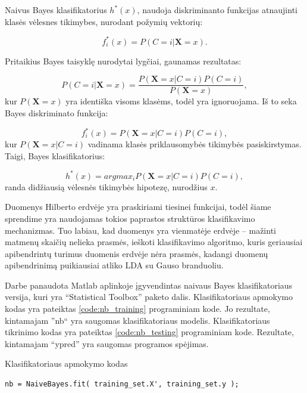 \documentclass[]{vgtuef}
\begin{document}
Naivus Bayes klasifikatorius $h^*(x)$, naudoja diskriminanto funkcijas atnaujinti klasės vėlesnes tikimybes, nurodant požymių vektorių:

\begin{equation}
	f^*_i(x) = P(C=i|\mathbf{X}=x).
\end{equation}

Pritaikius Bayes taisyklę nurodytai lygčiai, gaunamas rezultatas:

\begin{equation}
P(C=i|\mathbf{X}=x) = \frac{P(\mathbf{X}=x|C=i)P(C=i)}{P(\mathbf{X}=x)},
\end{equation}
kur $P(\mathbf{X}=x)$ yra identiška visoms klasėms, todėl yra ignoruojama. Iš to seka Bayes diskriminato funkcija:

\begin{equation}
	f^*_i(x) = P(\mathbf{X}=x|C=i)P(C=i),
\end{equation}
kur $P(\mathbf{X}=x|C=i)$ vadinama klasės priklausomybės tikimybės pasiskirstymas. Taigi, Bayes klasifikatorius:

\begin{equation}
h^*(x) = arg max_i P(\mathbf{X}=x|C=i)P(C=i),
\end{equation}
randa didžiausią vėlesnės tikimybės hipotezę, nurodžius $x$.

Duomenys Hilberto erdvėje yra praskiriami tiesinei funkcijai, todėl šiame sprendime yra naudojamas tokios paprastos struktūros klasifikavimo mechanizmas. Tuo labiau, kad duomenys yra vienmatėje erdvėje -- mažinti matmenų skaičių nelieka prasmės, ieškoti klasifikavimo algoritmo, kuris geriausiai apibendrintų turimus duomenis erdvėje nėra prasmės, kadangi duomenų apibendrinimą puikiausiai atliko LDA su Gauso branduoliu.

Darbe panaudota Matlab aplinkoje įgyvendintas naivaus Bayes klasifikatoriaus versija, kuri yra ``Statistical Toolbox'' paketo dalis. Klasifikatoriaus apmokymo kodas yra pateiktas \ref{code:nb_training} programiniam kode. Jo rezultate, kintamajam ''nb`` yra saugomas klasifikatoriaus modelis. Klasifikatoriaus tikrinimo kodas yra pateiktas \ref{code:nb_testing} programiniam kode. Rezultate, kintamajam ``ypred'' yra saugomas programos spėjimas.

\begin{cfigure}
	\centering
	\caption{Klasifikatoriaus apmokymo kodas}
	\label{code:nb_training}
	\begin{lstlisting}
nb = NaiveBayes.fit( training_set.X', training_set.y );
  \end{lstlisting}
\end{cfigure}
\end{document}
